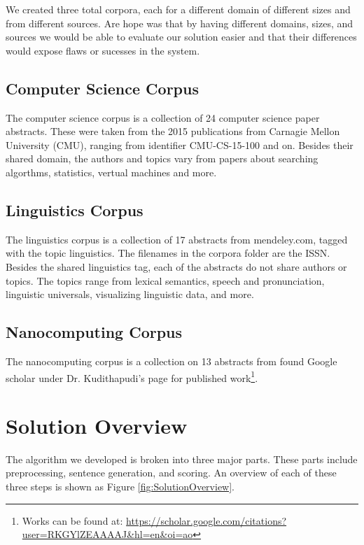 \documentclass[letterpaper, 10 pt, conference]{ieeeconf}  %
\begin{document}
We created three total corpora, each for a different domain of different sizes and from different sources. Are hope was that by having different domains, sizes, and sources we would be able to evaluate our solution easier and that their differences would expose flaws or sucesses in the system.

\subsection{Computer Science Corpus}

The computer science corpus is a collection of 24 computer science paper abstracts. These were taken from the 2015 publications from Carnagie Mellon University (CMU), ranging from identifier CMU-CS-15-100 and on. Besides their shared domain, the authors and topics vary from papers about searching algorthms, statistics, vertual machines and more.

\subsection{Linguistics Corpus}

The linguistics corpus is a collection of 17 abstracts from mendeley.com, tagged with the topic linguistics. The filenames in the corpora folder are the ISSN. Besides the shared linguistics tag, each of the abstracts do not share authors or topics. The topics range from lexical semantics, speech and pronunciation, linguistic universals, visualizing linguistic data, and more.

\subsection{Nanocomputing Corpus}

The nanocomputing corpus is a collection on 13 abstracts from found Google scholar under Dr. Kudithapudi's page for published work\footnote{Works can be found at: \url{https://scholar.google.com/citations?user=RKGYlZEAAAAJ&hl=en&oi=ao}}. 

\section{Solution Overview}

The algorithm we developed is broken into three major parts. These parts include preprocessing, sentence generation, and scoring. An overview of each of these three steps is shown as Figure \ref{fig:SolutionOverview}.
\end{document}
